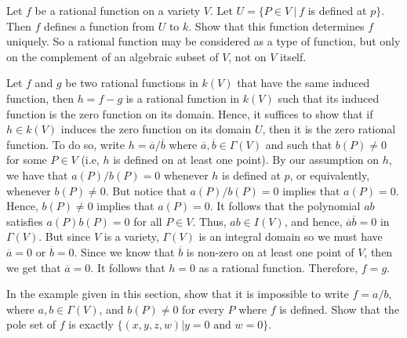 \begin{exercise}
    Let $f$ be a rational function on a variety $V$. Let $U = \{P \in V\ | \ f$ is defined at $p\}$. Then $f$ defines a function from $U$ to $k$. Show that this function determines $f$ uniquely. So a rational function may be considered as a type of function, but only on the complement of an algebraic subset of $V$, not on $V$ itself. \\
\end{exercise}

\begin{solution}
    Let $f$ and $g$ be two rational functions in $k(V)$ that have the same induced function, then $h = f-g$ is a rational function in $k(V)$ such that its induced function is the zero function on its domain. Hence, it suffices to show that if $h \in k(V)$ induces the zero function on its domain $U$, then it is the zero rational function. To do so, write $h = \overline{a}/\overline{b}$ where $\overline{a}, \overline{b} \in \Gamma(V)$ and such that $b(P) \neq 0$ for some $P \in V$ (i.e, $h$ is defined on at least one point). By our assumption on $h$, we have that $a(P)/b(P) = 0$ whenever $h$ is defined at $p$, or equivalently, whenever $b(P) \neq 0$. But notice that $a(P)/b(P) = 0$ implies that $a(P) = 0$. Hence, $b(P) \neq 0$ implies that $a(P) = 0$. It follows that the polynomial $ab$ satisfies $a(P)b(P) = 0$ for all $P \in V$. Thus, $ab \in I(V)$, and hence, $\overline{a}\overline{b} = 0$ in $\Gamma(V)$. But since $V$ is a variety, $\Gamma(V)$ is an integral domain so we must have $\overline{a} = 0$ or $\overline{b} = 0$. Since we know that $\overline{b}$ is non-zero on at least one point of $V$, then we get that $\overline{a} = 0$. It follows that $h = 0$ as a rational function. Therefore, $f = g$. \\
\end{solution}

\begin{exercise}
    In the example given in this section, show that it is impossible to write $f = a/b$, where $a,b \in \Gamma(V)$, and $b(P) \neq 0$ for every $P$ where $f$ is defined. Show that the pole set of $f$ is exactly $\{(x,y,z,w) | y=0 \text{ and } w=0\}$. \\
\end{exercise}


